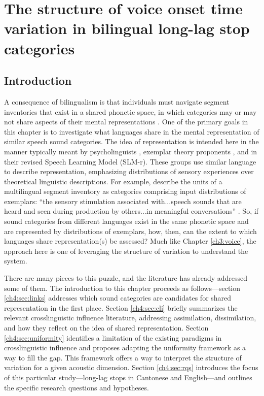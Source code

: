 \setcounter{chapter}{3}

\chapter{The structure of voice onset time variation in bilingual long-lag stop categories}\label{ch4:uniformity}

\section{Introduction}\label{ch4:sec:intro}

A consequence of bilingualism is that individuals must navigate segment inventories that exist in a shared phonetic space, in which categories may or may not share aspects of their mental representations \citep{flege_2021_slmr}. One of the primary goals in this chapter is to investigate what languages share in the mental representation of similar speech sound categories. The idea of representation is intended here in the manner typically meant by psycholinguists \citep[e.g.,][]{llompart_2018_acoustic}, exemplar theory proponents \citep[e.g.,][]{amengual_2018_laterals}, and \citet{flege_2021_slmr} in their revised Speech Learning Model (SLM-r). These groups use similar language to describe representation, emphasizing distributions of sensory experiences over theoretical linguistic descriptions. For example, \citeauthor{flege_2021_slmr} describe the units of a multilingual segment inventory as categories comprising input distributions of exemplars: ``the sensory stimulation associated with...speech sounds that are heard and seen during production by others...in meaningful conversations'' \citep[][p. 32]{flege_2021_slmr}. So, if sound categories from different languages exist in the same phonetic space and are represented by distributions of exemplars, how, then, can the extent to which languages share representation(s) be assessed? Much like Chapter \ref{ch3:voice}, the approach here is one of leveraging the structure of variation to understand the system. 

There are many pieces to this puzzle, and the literature has already addressed some of them. The introduction to this chapter proceeds as follows---section \ref{ch4:sec:links} addresses which sound categories are candidates for shared representation in the first place. Section \ref{ch4:sec:cli} briefly summarizes the relevant crosslinguistic influence literature, addressing assimilation, dissimilation, and how they reflect on the idea of shared representation. Section \ref{ch4:sec:uniformity} identifies a limitation of the existing paradigms in crosslinguistic influence and proposes adapting the uniformity framework as a way to fill the gap. This framework offers a way to interpret the structure of variation for a given acoustic dimension. Section \ref{ch4:sec:rqs} introduces the focus of this particular study---long-lag stops in Cantonese and English---and outlines the specific research questions and hypotheses.

